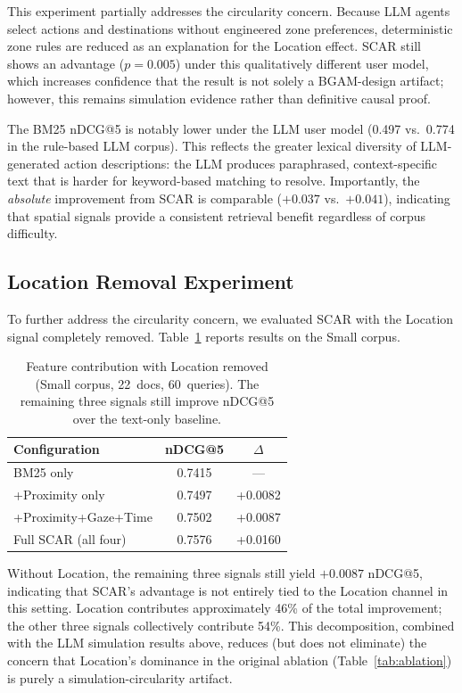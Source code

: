 \documentclass[journal]{IEEEtran}
\begin{document}
This experiment partially addresses the circularity concern. Because LLM agents select actions and destinations without engineered zone preferences, deterministic zone rules are reduced as an explanation for the Location effect. SCAR still shows an advantage ($p = 0.005$) under this qualitatively different user model, which increases confidence that the result is not solely a BGAM-design artifact; however, this remains simulation evidence rather than definitive causal proof.

The BM25 nDCG@5 is notably lower under the LLM user model (0.497 vs.\ 0.774 in the rule-based LLM corpus).  This reflects the greater lexical diversity of LLM-generated action descriptions: the LLM produces paraphrased, context-specific text that is harder for keyword-based matching to resolve.  Importantly, the \emph{absolute} improvement from SCAR is comparable ($+0.037$ vs.\ $+0.041$), indicating that spatial signals provide a consistent retrieval benefit regardless of corpus difficulty.

\subsection{Location Removal Experiment}
\label{subsec:location_removal}

To further address the circularity concern, we evaluated SCAR with the Location signal completely removed. Table~\ref{tab:location_removal} reports results on the Small corpus.

\begin{table}[htbp]
\centering
\caption{Feature contribution with Location removed (Small corpus, 22~docs, 60~queries). The remaining three signals still improve nDCG@5 over the text-only baseline.}
\label{tab:location_removal}
\begin{tabular}{lcc}
\hline
\textbf{Configuration} & \textbf{nDCG@5} & \textbf{$\Delta$} \\
\hline
BM25 only              & 0.7415 & --- \\
+Proximity only        & 0.7497 & +0.0082 \\
+Proximity+Gaze+Time   & 0.7502 & +0.0087 \\
Full SCAR (all four)   & 0.7576 & +0.0160 \\
\hline
\end{tabular}
\end{table}

Without Location, the remaining three signals still yield $+0.0087$ nDCG@5, indicating that SCAR's advantage is not entirely tied to the Location channel in this setting. Location contributes approximately 46\% of the total improvement; the other three signals collectively contribute 54\%. This decomposition, combined with the LLM simulation results above, reduces (but does not eliminate) the concern that Location's dominance in the original ablation (Table~\ref{tab:ablation}) is purely a simulation-circularity artifact.
\end{document}
